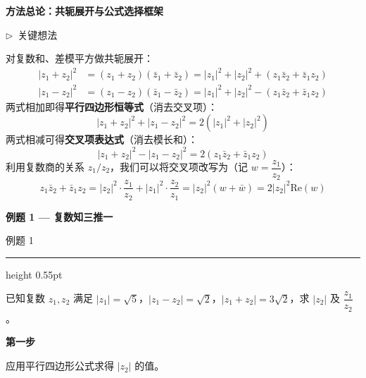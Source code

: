 \documentclass{exam-zh}
\newcommand{\edukai}{\kaishu}
\newcommand{\eduSectionTitle}[1]{%
  \needspace{5\baselineskip}%
  \vspace{2mm}
  {\color{edu-blue}\bfseries\large #1}\par
  \vspace{3mm}
}
\newenvironment{eduSubQuestionItem}[1]{%
  \needspace{4\baselineskip}%
  \vspace{2mm}
  \par\noindent
  \hangindent=8mm\hangafter=1
  {\color{edu-blue}\bfseries #1}\enspace
  \begingroup
  \color{edu-ink}
}{%
  \endgroup
  \par
  \vspace{3mm}
}
\newenvironment{eduAuxItem}[1]{%
  \needspace{4\baselineskip}%
  \vspace{2mm}
  \par\noindent
  \hangindent=8mm\hangafter=1
  {\color{edu-blue}\edukai $\triangleright$~#1}\enspace
  \begingroup
  \color{edu-ink}
  \edukai
}{%
  \endgroup
  \par
  \vspace{4mm}
}
\newenvironment{eduProblemBlock}[1][题目]{%
  \needspace{8\baselineskip}
  {\small\color{edu-muted}#1}\par
  \vspace{1.5mm}
  {\color{edu-blue}\hrule height 0.55pt}
  \vspace{4.5mm}
  \begingroup
  \color{edu-ink}
  \large
  \setlength{\parskip}{2.2mm}
  \linespread{1.20}\selectfont
}{%
  \par
  \endgroup
  \vspace{6mm}
}
\begin{document}
\eduSectionTitle{方法总论：共轭展开与公式选择框架}





\begin{eduAuxItem}{关键想法}
对复数和、差模平方做共轭展开：
\begin{align*}
  |z_1 + z_2|^2 &= (z_1 + z_2)(\bar{z}_1 + \bar{z}_2) = |z_1|^2 + |z_2|^2 + (z_1\bar{z}_2 + \bar{z}_1z_2) \\
  |z_1 - z_2|^2 &= (z_1 - z_2)(\bar{z}_1 - \bar{z}_2) = |z_1|^2 + |z_2|^2 - (z_1\bar{z}_2 + \bar{z}_1z_2)
\end{align*}
两式相加即得\textbf{平行四边形恒等式}（消去交叉项）：
\begin{equation*}
  |z_1 + z_2|^2 + |z_1 - z_2|^2 = 2(|z_1|^2 + |z_2|^2)
\end{equation*}
两式相减可得\textbf{交叉项表达式}（消去模长和）：
\begin{equation*}
  |z_1 + z_2|^2 - |z_1 - z_2|^2 = 2(z_1\bar{z}_2 + \bar{z}_1z_2)
\end{equation*}
利用复数商的关系 $z_1/z_2$，我们可以将交叉项改写为（记 $w = \dfrac{z_1}{z_2}$）：
\begin{equation*}
  z_1\bar{z}_2 + \bar{z}_1z_2 = |z_2|^2 \cdot \frac{z_1}{z_2} + |z_1|^2 \cdot \frac{z_2}{z_1} = |z_2|^2 \left( w + \bar{w} \right) = 2|z_2|^2 \mathrm{Re}(w)
\end{equation*}\end{eduAuxItem}



\eduSectionTitle{例题 1 — 复数知三推一}

\begin{eduProblemBlock}[例题 1]
已知复数 $z_1, z_2$ 满足 $|z_1| = \sqrt{5}$，$|z_1 - z_2| = \sqrt{2}$，$|z_1 + z_2| = 3\sqrt{2}$，求 $|z_2|$ 及 $\dfrac{z_1}{z_2}$。
\end{eduProblemBlock}









\begin{eduSubQuestionItem}{第一步}
应用平行四边形公式求得 $|z_2|$ 的值。\end{eduSubQuestionItem}
\end{document}
